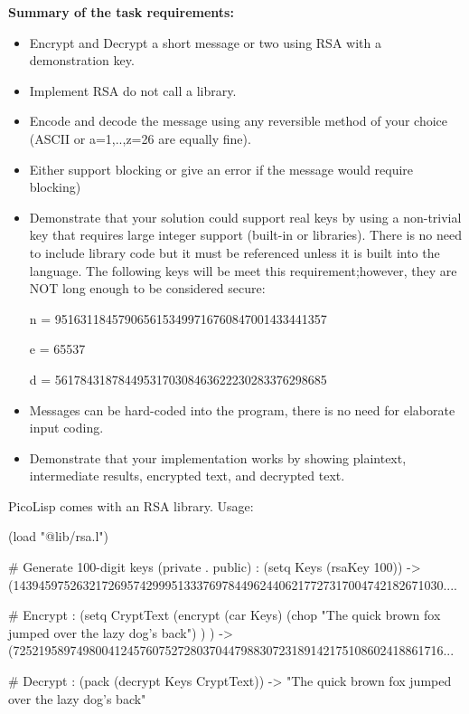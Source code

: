 \textbf{Summary of the task requirements:}

\begin{itemize}
\item
  Encrypt and Decrypt a short message or two using RSA with a
  demonstration key.
\item
  Implement RSA do not call a library.
\item
  Encode and decode the message using any reversible method of your
  choice (ASCII or a=1,..,z=26 are equally fine).
\item
  Either support blocking or give an error if the message would require
  blocking)
\item
  Demonstrate that your solution could support real keys by using a
  non-trivial key that requires large integer support (built-in or
  libraries). There is no need to include library code but it must be
  referenced unless it is built into the language. The following keys
  will be meet this requirement;however, they are NOT long enough to be
  considered secure:

n = 9516311845790656153499716760847001433441357

e = 65537

d = 5617843187844953170308463622230283376298685

\item
  Messages can be hard-coded into the program, there is no need for
  elaborate input coding.
\item
  Demonstrate that your implementation works by showing plaintext,
  intermediate results, encrypted text, and decrypted text.
\end{itemize}

\begin{wideverbatim}

PicoLisp comes with an RSA library. Usage:

(load "@lib/rsa.l")

# Generate 100-digit keys (private . public)
: (setq Keys (rsaKey 100))
-> (14394597526321726957429995133376978449624406217727317004742182671030....

# Encrypt
: (setq CryptText
   (encrypt (car Keys)
      (chop "The quick brown fox jumped over the lazy dog's back") ) )
-> (72521958974980041245760752728037044798830723189142175108602418861716...

# Decrypt
: (pack (decrypt Keys CryptText))
-> "The quick brown fox jumped over the lazy dog's back"

\end{wideverbatim}

